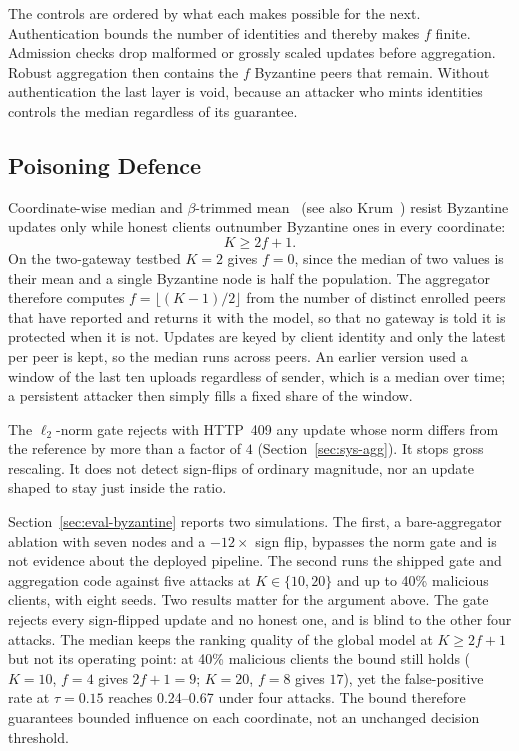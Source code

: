 The controls are ordered by what each makes possible for the next. Authentication bounds the number of identities and thereby makes $f$ finite. Admission checks drop malformed or grossly scaled updates before aggregation. Robust aggregation then contains the $f$ Byzantine peers that remain. Without authentication the last layer is void, because an attacker who mints identities controls the median regardless of its guarantee.

\subsection{Poisoning Defence}
\label{sec:sec-poison}
Coordinate-wise median and $\beta$-trimmed mean~\cite{yin2018} (see also Krum~\cite{blanchard2017}) resist Byzantine updates only while honest clients outnumber Byzantine ones in every coordinate:
\begin{equation}
  K \ge 2f + 1 .
  \label{eq:security:byz-bound}
\end{equation}
On the two-gateway testbed $K=2$ gives $f=0$, since the median of two values is their mean and a single Byzantine node is half the population. The aggregator therefore computes $f=\lfloor (K-1)/2\rfloor$ from the number of distinct enrolled peers that have reported and returns it with the model, so that no gateway is told it is protected when it is not. Updates are keyed by client identity and only the latest per peer is kept, so the median runs across peers. An earlier version used a window of the last ten uploads regardless of sender, which is a median over time; a persistent attacker then simply fills a fixed share of the window.

The $\ell_2$-norm gate rejects with HTTP~409 any update whose norm differs from the reference by more than a factor of $4$ (Section~\ref{sec:sys-agg}). It stops gross rescaling. It does not detect sign-flips of ordinary magnitude, nor an update shaped to stay just inside the ratio.

Section~\ref{sec:eval-byzantine} reports two simulations. The first, a bare-aggregator ablation with seven nodes and a $-12\times$ sign flip, bypasses the norm gate and is not evidence about the deployed pipeline. The second runs the shipped gate and aggregation code against five attacks at $K\in\{10,20\}$ and up to 40\% malicious clients, with eight seeds. Two results matter for the argument above. The gate rejects every sign-flipped update and no honest one, and is blind to the other four attacks. The median keeps the ranking quality of the global model at $K\ge 2f+1$ but not its operating point: at 40\% malicious clients the bound still holds ($K=10$, $f=4$ gives $2f+1=9$; $K=20$, $f=8$ gives $17$), yet the false-positive rate at $\tau=0.15$ reaches 0.24--0.67 under four attacks. The bound therefore guarantees bounded influence on each coordinate, not an unchanged decision threshold.

